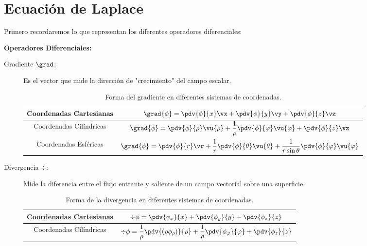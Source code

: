 \section*{Ecuación de Laplace}
Primero recordaremos lo que representan los diferentes operadores diferenciales:


\begin{mdframed}[style=warning]
	{\Large \textbf{Operadores Diferenciales:}} \\
	\begin{description}
		\item[Gradiente $\grad$: ] Es el vector que mide la dirección de "crecimiento" del campo escalar.
			\begin{table}[H]
				\centering
				\caption{Forma del gradiente en diferentes sistemas de coordenadas.}
				\label{grad}
				\begin{tabular}{||c|c||}
					\hline
					\hline
						Coordenadas Cartesianas & $ \grad{\phi} = \displaystyle\pdv{\phi}{x} \vx +\displaystyle\pdv{\phi}{y} \vy + \displaystyle\pdv{\phi}{z} \vz $ \\
					\hline
						Coordenadas Cilíndricas & $ \grad{\phi} = \displaystyle\pdv{\phi}{\rho} \vu{\rho} + \dfrac{1}{\rho} \displaystyle\pdv{\phi}{\varphi} \vu{\varphi} + \displaystyle\pdv{\phi}{z} \vz $ \\
					\hline
						Coordenadas Esféricas & $ \grad{\phi} = \displaystyle\pdv{\phi}{r} \vr + \dfrac{1}{r} \displaystyle\pdv{\phi}{\theta} \vu{\theta} + \dfrac{1}{r\sin{\theta}} \displaystyle\pdv{\phi}{\varphi} \vu{\varphi} $ \\
					\hline
					\hline
				\end{tabular}
			\end{table}
		\item[Divergencia $\div$: ] Mide la diferencia entre el flujo entrante y saliente de un campo vectorial sobre una superficie.
			\begin{table}[H]
				\centering
				\caption{Forma de la divergencia en diferentes sistemas de coordenadas.}
				\label{div}
				\begin{tabular}{||c|c||}
					\hline
					\hline
						Coordenadas Cartesianas & $ \div{\phi} = \displaystyle\pdv{\phi _x}{x} +\displaystyle\pdv{\phi _y}{y} + \displaystyle\pdv{\phi _z}{z} $ \\
					\hline
						Coordenadas Cilíndricas & $ \div{\phi} = \dfrac{1}{\rho}\displaystyle\pdv{(\rho \phi _\rho)}{\rho} + \dfrac{1}{\rho} \displaystyle\pdv{\phi _\varphi}{\varphi} + \displaystyle\pdv{\phi _z}{z} $ \\

\end{tabular}
\end{table}
\end{description}
\end{mdframed}
